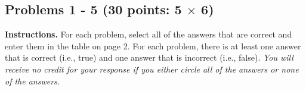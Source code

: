 \documentclass[letterpaper]{article}
\begin{document}
%
%
%
%
%

\newpage

\subsection*{Problems 1 - 5 {\rm (30 points: 5 $\times$ 6)}}

{\bf Instructions.} For each problem, select all of the answers that are correct and enter them in the table on page 2. For each problem, there is at least one answer that is correct (i.e., true) and one answer that is incorrect (i.e., false). \textit{You will receive no credit for your response if you either circle all of the answers or none of the answers.}

\vspace{0.5in}
\end{document}

